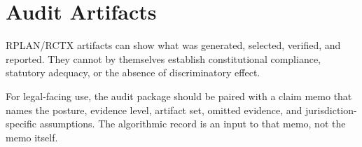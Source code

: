 \section{Audit Artifacts}

RPLAN/RCTX artifacts can show what was generated, selected, verified, and
reported. They cannot by themselves establish constitutional compliance,
statutory adequacy, or the absence of discriminatory effect.

For legal-facing use, the audit package should be paired with a claim memo that
names the posture, evidence level, artifact set, omitted evidence, and
jurisdiction-specific assumptions. The algorithmic record is an input to that
memo, not the memo itself.
